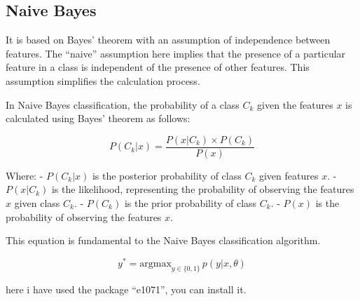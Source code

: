 \documentclass[a4paper,conference]{IEEEtran}
\newenvironment{Shaded}{\begin{snugshade}}{\end{snugshade}}
\newcommand{\AttributeTok}[1]{\textcolor[rgb]{0.13,0.29,0.53}{#1}}
\newcommand{\CommentTok}[1]{\textcolor[rgb]{0.56,0.35,0.01}{\textit{#1}}}
\newcommand{\DecValTok}[1]{\textcolor[rgb]{0.00,0.00,0.81}{#1}}
\newcommand{\FloatTok}[1]{\textcolor[rgb]{0.00,0.00,0.81}{#1}}
\newcommand{\FunctionTok}[1]{\textcolor[rgb]{0.13,0.29,0.53}{\textbf{#1}}}
\newcommand{\NormalTok}[1]{#1}
\newcommand{\OtherTok}[1]{\textcolor[rgb]{0.56,0.35,0.01}{#1}}
\newcommand{\SpecialCharTok}[1]{\textcolor[rgb]{0.81,0.36,0.00}{\textbf{#1}}}
\begin{document}
\hypertarget{sec:naive-bayes}{%
\subsection{Naive Bayes}\label{sec:naive-bayes}}

It is based on Bayes' theorem with an assumption of independence between
features. The ``naive'' assumption here implies that the presence of a
particular feature in a class is independent of the presence of other
features. This assumption simplifies the calculation process.

In Naive Bayes classification, the probability of a class \(C_k\) given
the features \(x\) is calculated using Bayes' theorem as follows:

\[ P(C_k | x) = \frac{{P(x | C_k) \times P(C_k)}}{{P(x)}} \]

Where: - \(P(C_k | x)\) is the posterior probability of class \(C_k\)
given features \(x\). - \(P(x | C_k)\) is the likelihood, representing
the probability of observing the features \(x\) given class \(C_k\). -
\(P(C_k)\) is the prior probability of class \(C_k\). - \(P(x)\) is the
probability of observing the features \(x\).

This equation is fundamental to the Naive Bayes classification
algorithm.

\[ y^* = \text{argmax}_{y \in \{0,1\}} \, p(y | x, \theta) \]

here i have used the package ``e1071'', you can install it.

\begin{Shaded}
\end{Shaded}
\end{document}
